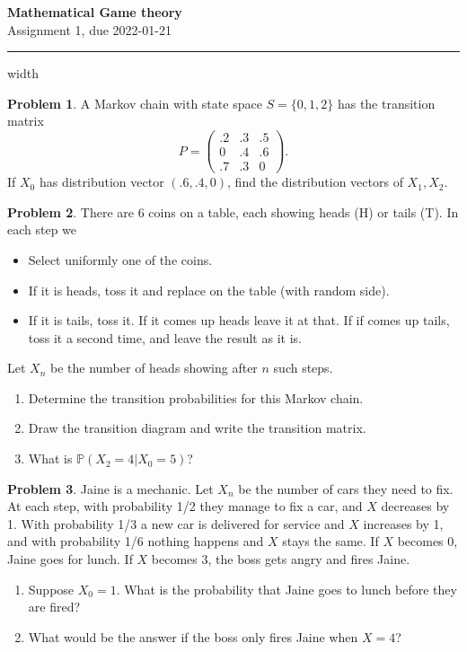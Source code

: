 \documentclass{article}
\renewcommand{\P}{\mathbb P}
\theoremstyle{definition}
\newtheorem{problem}{Problem}
\begin{document}
\thispagestyle{crfooter}

\begin{center}
  {\LARGE \textbf{Mathematical Game theory}} \\
  {\Large Assignment 1, due 2022-01-21}
\end{center}

\hrule width \textwidth \bigskip

\begin{problem}
  A Markov chain with state space $S=\{0,1,2\}$ has the transition matrix
  \[
    P =
    \begin{pmatrix}
      .2 & .3 & .5 \\
      0 & .4 & .6 \\
      .7 & .3 & 0
    \end{pmatrix}.
  \]
  If $X_0$ has distribution vector $(.6,.4,0)$, find the distribution vectors of $X_1,X_2$.
\end{problem}


\begin{problem}
  There are 6 coins on a table, each showing heads (H) or tails (T).
  In each step we 
  \begin{itemize}
  \item Select uniformly one of the coins.
  \item If it is heads, toss it and replace on the table (with random side).
  \item If it is tails, toss it.
    If it comes up heads leave it at that.
    If if comes up tails, toss it a second time, and leave the result as it is.
  \end{itemize}
  Let $X_n$ be the number of heads showing after $n$ such steps.
  \begin{enumerate}
  \item Determine the transition probabilities for this Markov chain.
  \item Draw the transition diagram and write the transition matrix.
  \item What is $\P(X_2=4 | X_0=5)$?
  \end{enumerate}
\end{problem}


\begin{problem}
  Jaine is a mechanic.
  Let $X_n$ be the number of cars they need to fix.
  At each step, with probability 1/2 they manage to fix a car, and $X$ decreases by 1.
  With probability 1/3 a new car is delivered for service and $X$ increases by 1, and with probability 1/6 nothing happens and $X$ stays the same.
  If $X$ becomes 0, Jaine goes for lunch.
  If $X$ becomes 3, the boss gets angry and fires Jaine.

  \begin{enumerate}
  \item Suppose $X_0=1$.
    What is the probability that Jaine goes to lunch before they are fired?
  \item What would be the answer if the boss only fires Jaine when $X=4$?
  \end{enumerate}
\end{problem}
\end{document}
